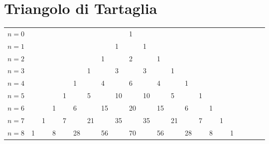 \section{Triangolo di Tartaglia}
\label{sec:TriangolodiTartaglia}
\begin{center}
	\setlength{\tabcolsep}{0pt}
\begin{tabular}{l<{\qquad}*{21}{T}} 
$n=0$&&&&&&&&&1\\
$n=1$&&&&&&&&1&&1\\
$n=2$&&&&&&&1&&2&&1\\
$n=3$&&&&&&1&&3&&3&&1\\
$n=4$&&&&&1&&4&&6&&4&&1\\
$n=5$&&&&1&&5&&10&&10&&5&&1\\
$n=6$&&&1&&6&&15&&20&&15&&6&&1\\
$n=7$&&1&&7&&21&&35&&35&&21&&7&&1\\
$n=8$&1&&8&&28&&56&&70&&56&&28&&8&&1\\
\end{tabular}
\label{tab:trinagoloditartaglia}
\end{center}

